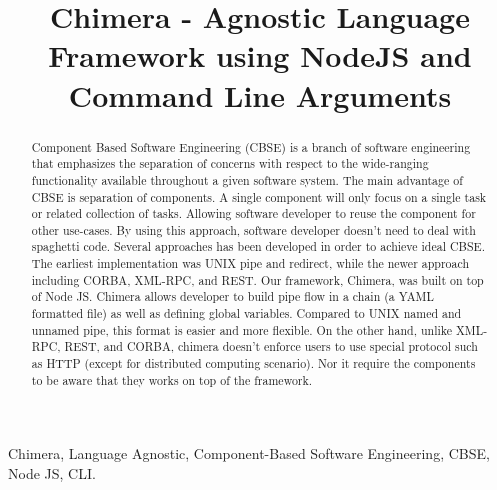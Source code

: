 \documentclass[conference]{IEEEtran}
\begin{document}
\title{Chimera - Agnostic Language Framework using NodeJS and Command Line Arguments}

\author{
\and
{}
\and
{}
}

\maketitle


\begin{abstract}
Component Based Software Engineering (CBSE) is a branch of software 
engineering that emphasizes the separation of concerns with respect to the 
wide-ranging functionality available throughout a given software system.  The 
main advantage of CBSE is separation of components. A single component will 
only focus on a single task or related collection of tasks. Allowing software 
developer to reuse the component for other use-cases. By using this approach, 
software developer doesn't need to deal with spaghetti code. Several 
approaches has been developed in order to achieve ideal CBSE. The earliest 
implementation was UNIX pipe and redirect, while the newer approach including 
CORBA, XML-RPC, and REST. Our framework, Chimera, was built on top of Node JS. 
Chimera allows developer to build pipe flow in a chain (a YAML formatted file) 
as well as defining global variables. Compared to UNIX named and unnamed pipe, 
this format is easier and more flexible. On the other hand, unlike XML-RPC, 
REST, and CORBA, chimera doesn't enforce users to use special protocol such as 
HTTP (except for distributed computing scenario). Nor it require the components
to be aware that they works on top of the framework.
\end{abstract}

\begin{IEEEkeywords}
Chimera, Language Agnostic, Component-Based Software Engineering, CBSE, Node JS, CLI.
\end{IEEEkeywords}
\end{document}
